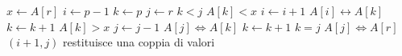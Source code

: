 \begin{codebox}
\li $x \gets A[r]$
\li $i \gets p-1$
\li $k \gets p$
\li $j \gets r$
\li \While $k < j$
\li \Do
        \If $A[k] < x$
\li     \Then
        	$i \gets  i + 1$
\li         $A[i] \leftrightarrow A[k]$
\li         $k \gets k + 1$
\li		\ElseIf $A[k] > x$
\li		\Then
         	$j \gets j - 1$
\li         $A[j] \Leftrightarrow A[k]$
\li		\ElseNoIf
\li			$k \gets k + 1$
		\End
    \End
\zi \Comment $k = j$
\li $A[j] \Leftrightarrow A[r]$
\li \Return $(i+1,j)$ \Comment restituisce una coppia di valori
\end{codebox}